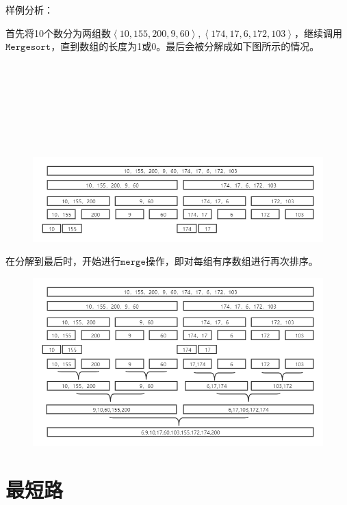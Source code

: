 \documentclass[UTF8,a4paperdui, %
]{ctexart}
\begin{document}
样例分析：

首先将10个数分为两组数$\left \langle10,155,200,9,60\right \rangle ,\left \langle 174,17,6,172,103\right \rangle $，继续调用$\texttt{Mergesort}$，直到数组的长度为1或0。最后会被分解成如下图所示的情况。\\
\\
\\
\\
\\
\\
\\
\\
\begin{figure}[ht]
\centering
\includegraphics[scale=0.6]{1-example1.png}
\end{figure}

在分解到最后时，开始进行$\texttt{merge}$操作，即对每组有序数组进行再次排序。


\begin{figure}[ht]
\centering
\includegraphics[scale=0.5]{1-example3.png}
\end{figure}

\section{最短路}
\end{document}
